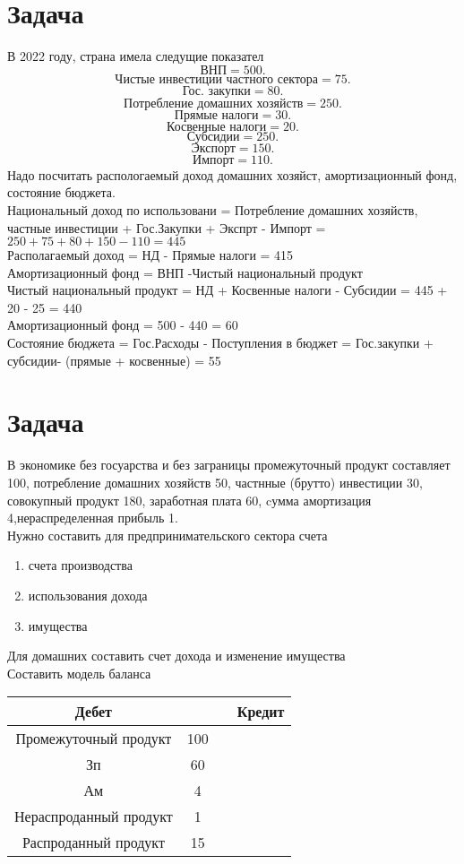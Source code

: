 \documentclass[14pt]{extarticle}
\begin{document}
\section{Задача}
В 2022 году, страна имела следущие показател
\[
    \text{ВНП} = 500
.\] 
\[
    \text{Чистые инвестиции частного сектора} = 75
.\] 
\[
    \text{Гос. закупки} =  80
.\] 
\[
    \text{Потребление домашних хозяйств}  = 250
.\] 
\[
    \text{Прямые налоги} = 30
.\] 
\[
    \text{Косвенные налоги} =20
.\] 
\[
    \text{Субсидии} = 250
.\] 
\[
    \text{Экспорт} = 150
.\] 
\[
    \text{Импорт} = 110
.\] 
Надо посчитать распологаемый доход домашних хозяйст, амортизационный фонд, состояние бюджета.\\
Национальный доход по использовани =  Потребление домашних хозяйств, частные инвестиции + Гос.Закупки + Экспрт - Импорт =  $250 + 75 + 80 + 150 - 110 = 445$ \\
Располагаемый доход = НД - Прямые налоги = 415\\
Амортизационный фонд = ВНП  -Чистый национальный продукт\\
    Чистый национальный продукт = НД + Косвенные налоги - Субсидии = 445 + 20 - 25 = 440\\
    Амортизационный фонд = 500 - 440 = 60\\
    Состояние бюджета = Гос.Расходы -  Поступления в бюджет = Гос.закупки + субсидии- (прямые + косвенные) = 55
\section{Задача}
В экономике без госуарства и без заграницы промежуточный продукт составляет 100, потребление домашних хозяйств 50, частнные (брутто) инвестиции 30, совокупный продукт 180, заработная плата 60, cумма амортизация 4,нераспределенная прибыль 1.\\
Нужно составить для предпринимательского сектора счета 
\begin{enumerate}
    \item счета производства
    \item использования дохода
    \item имущества
\end{enumerate}
Для домашних составить счет дохода и изменение имущества\\
Составить модель баланса\\
\begin{tabular}{|c|c|c|c|}
    Дебет & & & Кредит\\
    \hline
    Промежуточный продукт & 100 & &\\
    \hline
    Зп & 60 & & \\
    \hline
    Ам & 4 & & \\
    \hline
    Нераспроданный продукт & 1 & & \\
    \hline
    Распроданный продукт  & 15 & & \\
\end{tabular}
\end{document}
